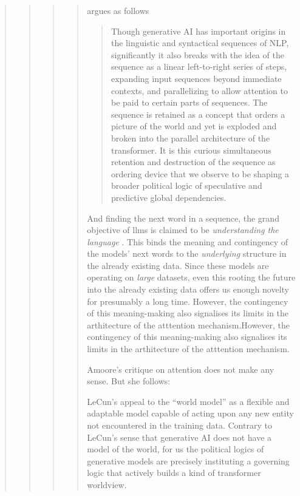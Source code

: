 \begin{quote}
\begin{quote}
\begin{quote}
\begin{quote}
{\citeauthor[5]{amoore2024} argues as follows
\begin{quote}
	Though generative AI has important origins in the linguistic and syntactical sequences of NLP, significantly it also breaks with the idea of the sequence as a linear left-to-right series of steps, expanding input sequences beyond immediate contexts, and parallelizing to allow attention to be paid to certain parts of sequences. The sequence is retained as a concept that orders a picture of the world and yet is exploded and broken into the parallel architecture of the transformer. It is this curious simultaneous retention and destruction of the sequence as ordering device that we observe to be shaping a broader political logic of speculative and predictive global dependencies.
\end{quote}

And finding the next word in a sequence, the grand objective of \glspl{llm} is
claimed to be \textit{understanding the language} \parencite[]{nvidia2024}.
This binds the meaning and contingency of the models' next words to the
\textit{underlying} structure in the already existing data. Since these models
are operating on \textit{large} datasets, even this rooting the future into the
already existing data offers us enough novelty for presumably a long time.
However, the contingency of this meaning-making also signalises its limits in
the arthitecture of the atttention mechanism.However, the contingency of this
meaning-making also signalises its limits in the arthitecture of the atttention
mechanism.

\begin{orangebox}
	Amoore's critique on attention does not make any sense. But she follows:

	LeCun’s appeal to the “world model” as a flexible and adaptable model capable of acting upon any new entity not encountered in the training data. Contrary to LeCun’s sense that generative AI does not have a model of the world, for us the political logics of generative models are precisely instituting a governing logic that actively builds a kind of transformer worldview.
\end{orangebox}


}
\end{quote}
\end{quote}
\end{quote}
\end{quote}
